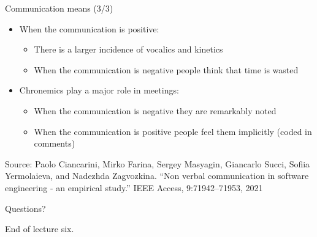 \documentclass{beamer}
\begin{document}
\begin{frame}
{\centerline{Communication means (3/3)}}

\begin{itemize}
\item When the communication is positive:
\begin{itemize}
\item There is a larger incidence of vocalics and kinetics
\item When the communication is negative people think that time is wasted 
\end{itemize}
\item Chronemics play a major role in meetings:
\begin{itemize}
\item When the communication is negative they are remarkably noted 
\item When the communication is positive people feel them implicitly (coded in comments)
\end{itemize}

\end{itemize}

\begin{center}
    \tiny{Source: Paolo Ciancarini, Mirko Farina, Sergey Masyagin, Giancarlo Succi, Sofiia Yermolaieva, and Nadezhda Zagvozkina. ``Non verbal communication in software engineering - an empirical study.'' IEEE Access, 9:71942–71953, 2021}
\end{center}

\end{frame}




\begin{frame}
{\centerline{Questions?}}
\vspace{1cm}
\begin{center}
    \LARGE{End of lecture six.}
\end{center}

\end{frame}
\end{document}
